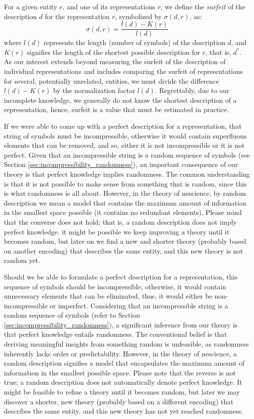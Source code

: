 For a given entity $e$, and one of its representations $r$, we define the \emph{surfeit} of the description $d$ for the representation $r$, symbolized by $\sigma(d, r)$, as:
\[
\sigma\left(d, r\right) = \frac{l \left(d\right) - K(r)}{l \left(d\right)}
\]
where $l \left(d\right)$ represents the length (number of symbols) of the description $d$, and $K(r)$ signifies the length of the shortest possible description for $r$, that is, $d^\ast$. As our interest extends beyond measuring the surfeit of the description of individual representations and includes comparing the surfeit of representations for several, potentially unrelated, entities, we must divide the difference $l \left(d\right) - K(r)$ by the normalization factor $l \left(d\right)$. Regrettably, due to our incomplete knowledge, we generally do not know the shortest description of a representation, hence, surfeit is a value that must be estimated in practice.

If we were able to come up with a perfect description for a representation, that string of symbols must be incompressible, otherwise it would contain superfluous elements that can be removed, and so, either it is not incompressible or it is not perfect. Given that an incompressible string is a random sequence of symbols (see Section \ref{sec:incompressibility_randomness}), an important consequence of our theory is that perfect knowledge implies randomness. The common understanding is that it is not possible to make sense from something that is random, since this is what randomness is all about. However, in the theory of nescience, by random description we mean a model that contains the maximum amount of information in the smallest space possible (it contains no redundant elements). Please mind that the converse does not hold; that is, a random description does not imply perfect knowledge. it might be possible we keep improving a theory until it becomes random, but later on we find a new and shorter theory (probably based on another encoding) that describes the same entity, and this new theory is not random yet.

Should we be able to formulate a perfect description for a representation, this sequence of symbols should be incompressible; otherwise, it would contain unnecessary elements that can be eliminated, thus, it would either be non-incompressible or imperfect. Considering that an incompressible string is a random sequence of symbols (refer to Section \ref{sec:incompressibility_randomness}), a significant inference from our theory is that perfect knowledge entails randomness. The conventional belief is that deriving meaningful insights from something random is unfeasible, as randomness inherently lacks order or predictability. However, in the theory of nescience, a random description signifies a model that encapsulates the maximum amount of information in the smallest possible space. Please note that the reverse is not true; a random description does not automatically denote perfect knowledge. It might be feasible to refine a theory until it becomes random, but later we may discover a shorter, new theory (probably based on a different encoding) that describes the same entity, and this new theory has not yet reached randomness.

